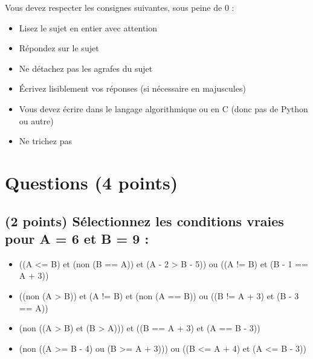 \documentclass[11pt,a4paper]{article}
\begin{document}
\MakeExamTitle                   %


\bigskip

Vous devez respecter les consignes suivantes, sous peine de 0 :

\begin{itemize}
\item Lisez le sujet en entier avec attention
\item Répondez sur le sujet
\item Ne détachez pas les agrafes du sujet
\item \'Ecrivez lisiblement vos réponses (si nécessaire en majuscules)
\item Vous devez écrire dans le langage algorithmique ou en C (donc pas de Python ou autre)
\item Ne trichez pas
\end{itemize}


\vfillFirst


\section{Questions (4 points)}

\subsection{(2 points) Sélectionnez les conditions vraies pour A = 6 et B = 9 : }

\bigskip

\begin{itemize}
  \item[\CaseCoche] ((A <= B) et (non (B == A)) et (A - 2 > B - 5)) ou ((A != B) et (B - 1 == A + 3)) \\ %
  \item[\checkmark] ((non (A > B)) et (A != B) et (non (A == B)) ou ((B != A + 3) et (B - 3 == A)) \\ %
  \item[\checkmark] (non ((A > B) et (B > A))) et ((B == A + 3) et (A == B - 3)) \\ %
  \item[\checkmark] (non ((A >= B - 4) ou (B >= A + 3))) ou ((B <= A + 4) et (A <= B - 3)) \\ %
\end{itemize}
\end{document}
